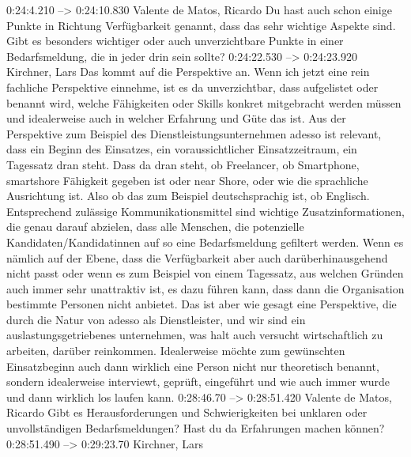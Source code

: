 0:24:4.210 --> 0:24:10.830
Valente de Matos, Ricardo
Du hast auch schon einige Punkte in Richtung Verfügbarkeit genannt, dass das sehr wichtige Aspekte sind. Gibt es besonders wichtiger oder auch unverzichtbare Punkte in einer Bedarfsmeldung, die in jeder drin sein sollte?
0:24:22.530 --> 0:24:23.920
Kirchner, Lars
Das kommt auf die Perspektive an. Wenn ich jetzt eine rein fachliche Perspektive einnehme, ist es da unverzichtbar, dass aufgelistet oder benannt wird, welche Fähigkeiten oder Skills konkret mitgebracht werden müssen und idealerweise auch in welcher Erfahrung und Güte das ist. Aus der Perspektive zum Beispiel des Dienstleistungsunternehmen adesso ist relevant, dass ein Beginn des Einsatzes, ein voraussichtlicher Einsatzzeitraum, ein Tagessatz dran steht. Dass da dran steht, ob Freelancer, ob Smartphone, smartshore Fähigkeit gegeben ist oder near Shore, oder wie die sprachliche Ausrichtung ist. Also ob das zum Beispiel deutschsprachig ist, ob Englisch. Entsprechend zulässige Kommunikationsmittel sind wichtige Zusatzinformationen, die genau darauf abzielen, dass alle Menschen, die potenzielle Kandidaten/Kandidatinnen auf so eine Bedarfsmeldung gefiltert werden. Wenn es nämlich auf der Ebene, dass die Verfügbarkeit aber auch darüberhinausgehend nicht passt oder wenn es zum Beispiel von einem Tagessatz, aus welchen Gründen auch immer sehr unattraktiv ist, es dazu führen kann, dass dann die Organisation bestimmte Personen nicht anbietet. Das ist aber wie gesagt eine Perspektive, die durch die Natur von adesso als Dienstleister, und wir sind ein auslastungsgetriebenes unternehmen, was halt auch versucht wirtschaftlich zu arbeiten, darüber reinkommen. Idealerweise möchte zum gewünschten Einsatzbeginn auch dann wirklich eine Person nicht nur theoretisch benannt, sondern idealerweise interviewt, geprüft, eingeführt und wie auch immer wurde und dann wirklich los laufen kann.
0:28:46.70 --> 0:28:51.420
Valente de Matos, Ricardo
Gibt es Herausforderungen und Schwierigkeiten bei unklaren oder unvollständigen Bedarfsmeldungen? Hast du da Erfahrungen machen können?
0:28:51.490 --> 0:29:23.70
Kirchner, Lars

